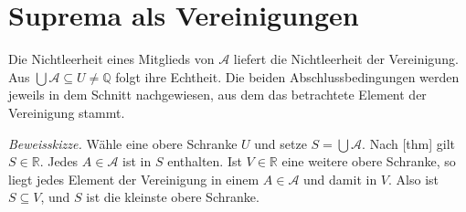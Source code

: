\documentclass[main.tex]{subfiles}
\begin{document}
\section{Suprema als Vereinigungen}


Die Nichtleerheit eines Mitglieds von \(\mathcal A\) liefert die
Nichtleerheit der Vereinigung. Aus
\(\bigcup\mathcal A\subseteq U\neq\mathbb Q\) folgt ihre Echtheit. Die beiden
Abschlussbedingungen werden jeweils in dem Schnitt nachgewiesen, aus dem das
betrachtete Element der Vereinigung stammt.


\emph{Beweisskizze.}
Wähle eine obere Schranke \(U\) und setze \(S=\bigcup\mathcal A\). Nach
[thm] gilt \(S\in\mathbb R\).
Jedes \(A\in\mathcal A\) ist in \(S\) enthalten. Ist \(V\in\mathbb R\)
eine weitere obere Schranke, so liegt jedes Element der Vereinigung in einem
\(A\in\mathcal A\) und damit in \(V\). Also ist \(S\subseteq V\), und \(S\)
ist die kleinste obere Schranke.
\end{document}
